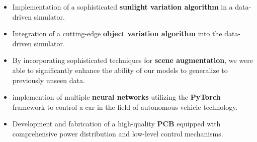 \documentclass[10pt,a4paper]{altacv}
\begin{document}

\begin{fullwidth}
\makecvheader
\end{fullwidth}




\begin{itemize}
\item Implementation of a sophisticated \textbf{sunlight variation algorithm} in a data-driven simulator.  
\item  Integration of a cutting-edge \textbf{object variation algorithm} into the data-driven simulator.
\item By incorporating sophisticated techniques for \textbf{scene augmentation}, we were able to significantly enhance the ability of our models to generalize to previously unseen data.
\end{itemize}
\medskip
\divider
{}
\begin{itemize}
\item implemention of multiple \textbf{neural networks} utilizing the \textbf{PyTorch} framework to control a car in the field of autonomous vehicle technology.
\item Development and fabrication of a high-quality \textbf{PCB} equipped with comprehensive power distribution and low-level control mechanisms.
\end{itemize}
\end{document}
